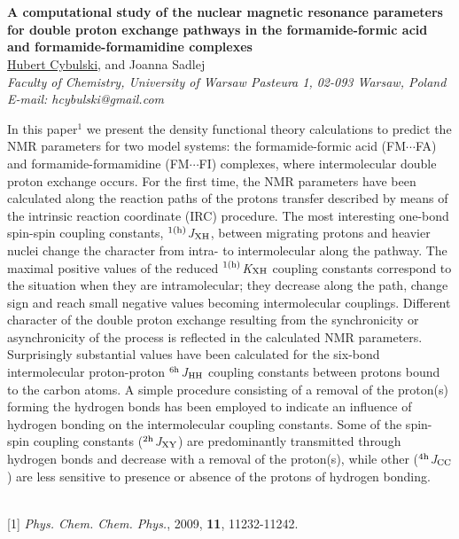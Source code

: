 \section*{}
\begin{center}
{\bf \Large
A computational study of the nuclear magnetic resonance parameters
for double proton exchange pathways
in the formamide-formic acid and formamide-formamidine complexes
}
\\
\vspace{0.5cm}
\underline{Hubert Cybulski}, and Joanna Sadlej
\\
\vspace{0.5cm}
{\it
Faculty of Chemistry, University of Warsaw
Pasteura 1, 02-093 Warsaw, Poland
}
\\
\vspace{0.5cm}
{\it E-mail: hcybulski@gmail.com}
\\
\vspace{0.5cm}
\end{center}
In this paper$^{1}$ we present the density functional theory calculations
to predict the NMR parameters for two model systems: the formamide-formic acid (FM$\cdots$FA)
and formamide-formamidine (FM$\cdots$FI) complexes, where intermolecular double proton 
exchange occurs. For the first time, the NMR parameters have been calculated along the reaction paths
of the protons transfer described by means of the intrinsic reaction coordinate (IRC) procedure.
The most interesting one-bond spin-spin coupling constants, $^{\rm 1(h)}$\textit{J}$_{\rm XH}$,
between migrating protons and heavier nuclei change the character from intra- to intermolecular
along the pathway.
The maximal positive values of the reduced $^{\rm 1(h)}$\textit{K}$_{\rm XH}$
coupling constants correspond
to the situation when they are intramolecular; they decrease
along the path, change sign and reach small negative values becoming intermolecular couplings.
Different character of the double proton exchange
resulting from the synchronicity or asynchronicity of the process
is reflected in the calculated NMR parameters.
Surprisingly substantial values have been calculated for the six-bond
intermolecular proton-proton $^{\rm 6h}$\textit{J}$_{\rm HH}$ coupling constants
between protons bound to the carbon atoms.
A simple procedure consisting of a removal of the proton(s) forming the hydrogen bonds
has been employed to indicate an influence of hydrogen
bonding on the intermolecular coupling constants.
Some of the spin-spin coupling constants ($^{\rm 2h}$\textit{J}$_{\rm XY}$)
are predominantly transmitted through hydrogen bonds and decrease
with a removal of the proton(s),
while other ($^{\rm 4h}$\textit{J}$_{\rm CC}$) are less sensitive
to presence or absence of the protons of hydrogen bonding.
\\
\begin{figure}[h]
 \centerline{}
 \caption[]{}\label{figure 1}
\end{figure}
\\
{\footnotesize
[1] {\textit{Phys. Chem. Chem. Phys.}}, 2009, \textbf{11}, 11232-11242.
}
\newpage
\setcounter{figure}{0}
